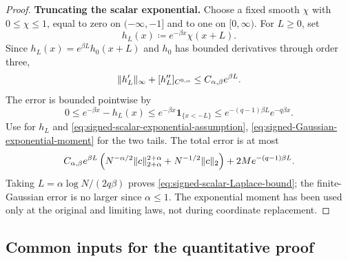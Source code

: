 \documentclass[11pt,reqno]{amsart}
\numberwithin{equation}{section}
\theoremstyle{plain}
\theoremstyle{remark}
\DeclarePairedDelimiter{\norm}{\lVert}{\rVert}
\newcommand{\be}{\beta}
\newcommand{\one}{\mathbf 1}
\newcommand{\step}[1]{\par\medskip\noindent\textbf{#1}}
\begin{document}
\begin{proof}
\step{Truncating the scalar exponential.}
Choose a fixed smooth $\chi$ with $0\leq\chi\leq1$, equal to zero on
$(-\infty,-1]$ and to one on $[0,\infty)$.  For $L\geq0$, set
\begin{equation}\label{eq:signed-exponential-test-cutoff}
 h_L(x)\coloneqq e^{-\be x}\chi(x+L).
\end{equation}
Since $h_L(x)=e^{\be L}h_0(x+L)$ and $h_0$ has bounded derivatives through
order three,
\begin{equation}\label{eq:signed-cutoff-derivatives}
 \norm{h_L'}_\infty+[h_L'']_{C^{0,\alpha}}
 \leq C_{\alpha,\be}e^{\be L}.
\end{equation}
The error is bounded pointwise by
\begin{equation}\label{eq:signed-cutoff-tail}
 0\leq e^{-\be x}-h_L(x)
 \leq e^{-\be x}\one_{\{x<-L\}}
 \leq e^{-(q-1)\be L}e^{-q\be x}.
\end{equation}
Use  for $h_L$ and
\eqref{eq:signed-scalar-exponential-assumption},
\eqref{eq:signed-Gaussian-exponential-moment} for the two tails.  The total
error is at most
\begin{equation}\label{eq:signed-Laplace-preoptimization}
 C_{\alpha,\be}e^{\be L}
 \left(N^{-\alpha/2}\norm c_{2+\alpha}^{2+\alpha}
                +N^{-1/2}\norm c_2\right)
 +2M e^{-(q-1)\be L}.
\end{equation}
Taking $L=\alpha\log N/(2q\be)$ proves
\eqref{eq:signed-scalar-Laplace-bound}; the finite-Gaussian error is no
larger since $\alpha\leq1$.  The exponential moment has been used only at
the original and limiting laws, not during coordinate replacement.
\end{proof}

\subsection{Common inputs for the quantitative proof}
\label{subsubsec:exact-profile-partition-inputs}
\end{document}
